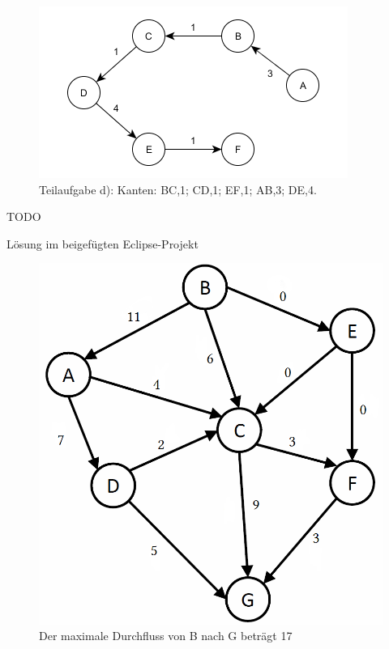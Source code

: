\documentclass[12pt]{scrartcl}
\begin{document}
\begin{figure}[h!]
\begin{center}
\includegraphics[scale=0.5]{KruskalSpannbaum.png}
\caption{Teilaufgabe d): Kanten: BC,1; CD,1; EF,1; AB,3; DE,4.}
\end{center}
\end{figure}


\exercise{}
TODO

\exercise{}
Lösung im beigefügten Eclipse-Projekt

\exercise{}
\begin{figure}[h!]
\begin{center}
\includegraphics[scale=0.4]{Durchfluss.png}
\caption{Der maximale Durchfluss von B nach G beträgt 17}
\end{center}
\end{figure}




\end{document}
